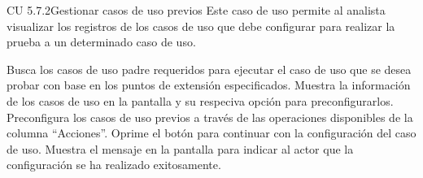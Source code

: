 \newpage 
\begin{UseCase}{CU 5.7.2}{Gestionar casos de uso previos}
	{
		Este caso de uso permite al analista visualizar los registros de los casos de uso que debe configurar para realizar la prueba a un determinado caso de uso. 
	}
	
	

	


\end{UseCase}
 \begin{UCtrayectoria}
    \UCpaso[\UCsist] Busca los casos de uso padre requeridos para ejecutar el caso de uso que se desea probar con base en los puntos de extensión especificados.
    \UCpaso[\UCsist] Muestra la información de los casos de uso en la pantalla  y su respeciva opción para preconfigurarlos. 
	\UCpaso[\UCactor] Preconfigura los casos de uso previos a través de las operaciones disponibles de la columna ``Acciones''.\label{cu5.7.2:gestionaCU}
    \UCpaso[\UCactor] Oprime el botón  para continuar con la configuración del caso de uso.  
    \UCpaso[\UCsist] Muestra el mensaje  en la pantalla  para indicar al actor que la configuración se ha realizado exitosamente.
 \end{UCtrayectoria}
 
